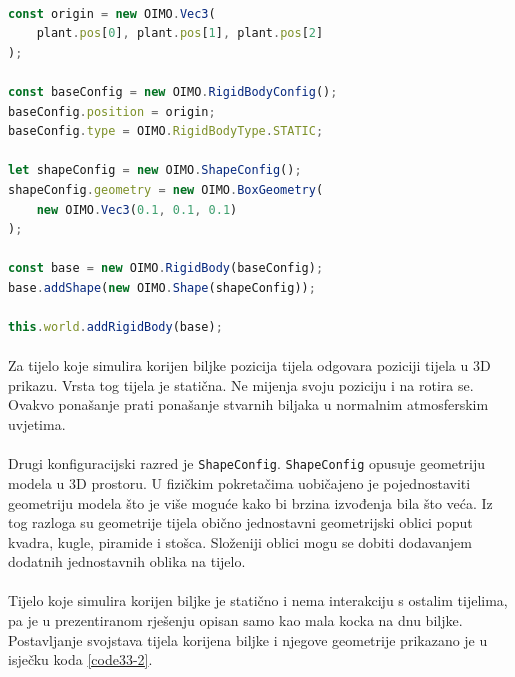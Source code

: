 \documentclass[times, utf8, diplomski]{fer}
\begin{document}
\paragraph{}

\begin{lstlisting}[language=Javascript, caption=Postavljanje tijela korijena biljke i njegovih svojstava,label=code33-2]
const origin = new OIMO.Vec3(
	plant.pos[0], plant.pos[1], plant.pos[2]
);

const baseConfig = new OIMO.RigidBodyConfig();
baseConfig.position = origin;
baseConfig.type = OIMO.RigidBodyType.STATIC;

let shapeConfig = new OIMO.ShapeConfig();
shapeConfig.geometry = new OIMO.BoxGeometry(
	new OIMO.Vec3(0.1, 0.1, 0.1)
);

const base = new OIMO.RigidBody(baseConfig);
base.addShape(new OIMO.Shape(shapeConfig));

this.world.addRigidBody(base);
\end{lstlisting}

\paragraph{}
Za tijelo koje simulira korijen biljke pozicija tijela odgovara poziciji tijela u 3D 
prikazu. Vrsta tog tijela je statična. Ne mijenja svoju poziciju i na rotira se. Ovakvo
ponašanje prati ponašanje stvarnih biljaka u normalnim atmosferskim uvjetima.

\paragraph{}
Drugi konfiguracijski razred je \verb#ShapeConfig#. \verb#ShapeConfig# opusuje geometriju 
modela u 3D prostoru. U fizičkim pokretačima uobičajeno je pojednostaviti geometriju modela
što je više moguće kako bi brzina izvođenja bila što veća. Iz tog razloga su geometrije 
tijela obično jednostavni geometrijski oblici poput kvadra, kugle, piramide i stošca.
Složeniji oblici mogu se dobiti dodavanjem dodatnih jednostavnih oblika na tijelo.

\paragraph{}
Tijelo koje simulira korijen biljke je statično i nema interakciju s ostalim tijelima, pa je
u prezentiranom rješenju opisan samo kao mala kocka na dnu biljke. Postavljanje svojstava 
tijela korijena biljke i njegove geometrije prikazano je u isječku koda \ref{code33-2}.
\end{document}
